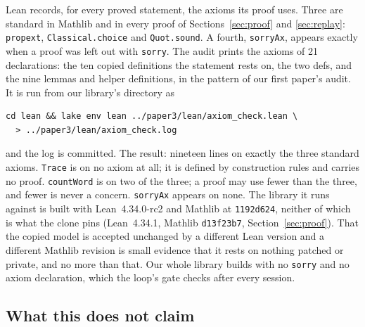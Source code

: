 Lean records, for every proved statement, the axioms its proof uses.
Three are standard in Mathlib and in every proof of
Sections~\ref{sec:proof} and \ref{sec:replay}: \texttt{propext},
\texttt{Classical.choice} and \texttt{Quot.sound}. A fourth,
\texttt{sorryAx}, appears exactly when a proof was left out with
\texttt{sorry}. The audit  prints
the axioms of 21 declarations: the ten copied definitions the statement
rests on, the two defs, and the nine lemmas and helper definitions, in
the pattern of our first paper's audit. It is run from our library's
directory as
\begin{verbatim}
cd lean && lake env lean ../paper3/lean/axiom_check.lean \
  > ../paper3/lean/axiom_check.log
\end{verbatim}
and the log is committed. The result: nineteen lines on exactly the
three standard axioms. \texttt{Trace} is on no axiom at all; it is defined by construction rules and carries no proof. \texttt{countWord} is on two of the three; a proof may use fewer than the three, and fewer is never a concern. \texttt{sorryAx} appears on none. The library it runs against is built with
Lean~4.34.0-rc2 and Mathlib at \texttt{1192d624}, neither of which is
what the clone pins (Lean~4.34.1, Mathlib \texttt{d13f23b7},
Section~\ref{sec:proof}). That the copied model is accepted unchanged
by a different Lean version and a different Mathlib revision is small
evidence that it rests on nothing patched or private, and no more than
that. Our whole library builds with no \texttt{sorry} and no axiom
declaration, which the loop's gate checks after every session.

\subsection{What this does not claim}
\label{sec:lean-notclaim}

